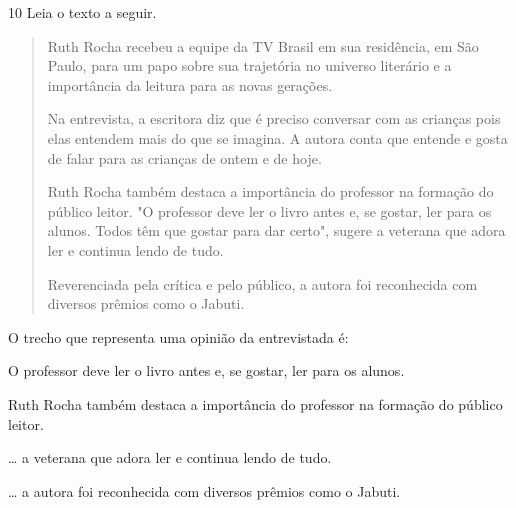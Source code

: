 \num{10} Leia o texto a seguir.

\begin{quote}
\noindent Ruth Rocha recebeu a equipe da TV Brasil em sua residência, em São
Paulo, para um papo sobre sua trajetória no universo literário e a
importância da leitura para as novas gerações.

Na entrevista, a escritora diz que é preciso conversar com as crianças
pois elas entendem mais do que se imagina. A autora conta que entende e
gosta de falar para as crianças de ontem e de hoje.

Ruth Rocha também destaca a importância do professor na formação do
público leitor. "O professor deve ler o livro antes e, se gostar, ler
para os alunos. Todos têm que gostar para dar certo", sugere a veterana
que adora ler e continua lendo de tudo.

Reverenciada pela crítica e pelo público, a autora foi reconhecida com
diversos prêmios como o Jabuti.

\end{quote}

\noindent O trecho que representa uma opinião da entrevistada é:

\begin{escolha}
\item O professor deve ler o livro antes e, se gostar, ler para os alunos.
\item Ruth Rocha também destaca a importância do professor na formação do
público leitor.
\item \ldots{} a veterana que adora ler e continua lendo de tudo.
\item \ldots{} a autora foi reconhecida com diversos prêmios como o Jabuti.
\end{escolha}




